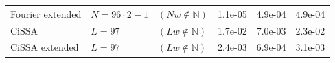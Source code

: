 \documentclass[a4paper, 11pt]{article}
\begin{document}
\begin{table}[H]
\begin{tabular}{l|ll|ccc}
		Fourier extended   &
		$N = 96\cdot2-1  $ & $ (Nw \not\in \mathbb{N})$                    & 1.1e-05 & 4.9e-04                          & 4.9e-04                                                      \\
		CiSSA              &
		$L = 97  $         & $ (Lw \not \in \mathbb{N})$                   & 1.7e-02 & 7.0e-03                          & 2.3e-02                                                      \\
		CiSSA extended     &
		$L = 97  $         & $ (Lw \not \in \mathbb{N})$                   & 2.4e-03 & 6.9e-04                          & 3.1e-03                                                      \\
		\hline
	\end{tabular}
	\label{tab:precise_separability_example1}
\end{table}

\end{document}
